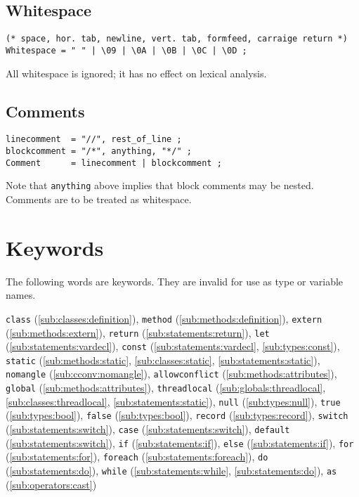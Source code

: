 \documentclass{article}
\begin{document}
\subsection{Whitespace}
\label{sub:lexicals:whitespace}
\begin{verbatim}
(* space, hor. tab, newline, vert. tab, formfeed, carraige return *)
Whitespace = " " | \09 | \0A | \0B | \0C | \0D ;
\end{verbatim}
All whitespace is ignored; it has no effect on lexical analysis.

\subsection{Comments}
\label{sub:lexicals:comments}
\begin{verbatim}
linecomment  = "//", rest_of_line ;
blockcomment = "/*", anything, "*/" ;
Comment      = linecomment | blockcomment ;
\end{verbatim}
Note that \texttt{anything} above implies that block comments may be nested.
Comments are to be treated as whitespace.

\section{Keywords}
\label{sec:keywords}
The following words are keywords. They are invalid for use as type or variable
names.

\texttt{class} (\ref{sub:classes:definition}),
\texttt{method} (\ref{sub:methods:definition}),
\texttt{extern} (\ref{sub:methods:extern}),
\texttt{return} (\ref{sub:statements:return}),
\texttt{let} (\ref{sub:statements:vardecl}),
\texttt{const} (\ref{sub:statements:vardecl}, \ref{sub:types:const}),
\texttt{static} (\ref{sub:methods:static}, \ref{sub:classes:static},
  \ref{sub:statements:static}),
\texttt{nomangle} (\ref{sub:cconv:nomangle}),
\texttt{allowconflict} (\ref{sub:methods:attributes}),
\texttt{global} (\ref{sub:methods:attributes}),
\texttt{threadlocal} (\ref{sub:globals:threadlocal},
                      \ref{sub:classes:threadlocal},
                      \ref{sub:statements:static}),
\texttt{null} (\ref{sub:types:null}),
\texttt{true} (\ref{sub:types:bool}),
\texttt{false} (\ref{sub:types:bool}),
\texttt{record} (\ref{sub:types:record}),
\texttt{switch} (\ref{sub:statements:switch}),
\texttt{case} (\ref{sub:statements:switch}),
\texttt{default} (\ref{sub:statements:switch}),
\texttt{if} (\ref{sub:statements:if}),
\texttt{else} (\ref{sub:statements:if}),
\texttt{for} (\ref{sub:statements:for}),
\texttt{foreach} (\ref{sub:statements:foreach}),
\texttt{do} (\ref{sub:statements:do}),
\texttt{while} (\ref{sub:statements:while}, \ref{sub:statements:do}),
\texttt{as} (\ref{sub:operators:cast})
\end{document}
